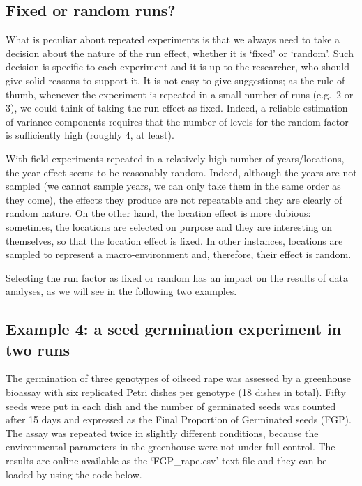 \documentclass[a4paper,12pt,oneside]{book}
\begin{document}
\hypertarget{fixed-or-random-runs}{%
\subsection{Fixed or random runs?}\label{fixed-or-random-runs}}

What is peculiar about repeated experiments is that we always need to take a decision about the nature of the run effect, whether it is `fixed' or `random'. Such decision is specific to each experiment and it is up to the researcher, who should give solid reasons to support it. It is not easy to give suggestions; as the rule of thumb, whenever the experiment is repeated in a small number of runs (e.g.~2 or 3), we could think of taking the run effect as fixed. Indeed, a reliable estimation of variance components requires that the number of levels for the random factor is sufficiently high (roughly 4, at least).

With field experiments repeated in a relatively high number of years/locations, the year effect seems to be reasonably random. Indeed, although the years are not sampled (we cannot sample years, we can only take them in the same order as they come), the effects they produce are not repeatable and they are clearly of random nature. On the other hand, the location effect is more dubious: sometimes, the locations are selected on purpose and they are interesting on themselves, so that the location effect is fixed. In other instances, locations are sampled to represent a macro-environment and, therefore, their effect is random.

Selecting the run factor as fixed or random has an impact on the results of data analyses, as we will see in the following two examples.

\hypertarget{example-4-a-seed-germination-experiment-in-two-runs}{%
\subsection{Example 4: a seed germination experiment in two runs}\label{example-4-a-seed-germination-experiment-in-two-runs}}

The germination of three genotypes of oilseed rape was assessed by a greenhouse bioassay with six replicated Petri dishes per genotype (18 dishes in total). Fifty seeds were put in each dish and the number of germinated seeds was counted after 15 days and expressed as the Final Proportion of Germinated seeds (FGP). The assay was repeated twice in slightly different conditions, because the environmental parameters in the greenhouse were not under full control. The results are online available as the `FGP\_rape.csv' text file and they can be loaded by using the code below.
\end{document}
